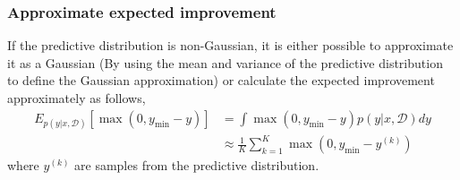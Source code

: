 
\subsubsection{Approximate expected improvement}
If the predictive distribution is non-Gaussian, it is either possible to approximate it as a Gaussian
(By using the mean and variance of the predictive distribution to define the Gaussian approximation)
or calculate the expected improvement approximately as follows, 
\begin{align}
    E_{p(y|x,\mathcal{D})}[\max(0,y_{\min}-y)] &= \int \max(0,y_{\min}-y) p(y|x,\mathcal{D}) dy\\
    &\approx \frac{1}{K} \sum_{k=1}^K  \max(0,y_{\min}-y^{(k)}) \label{aEI}
\end{align}
where $y^{(k)}$ are samples from the predictive distribution.





